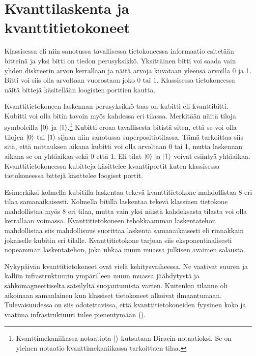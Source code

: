 \section{Kvanttilaskenta ja kvanttitietokoneet}
Klassisessa eli niin sanotussa tavallisessa tietokoneessa informaatio esitetään bitteinä ja yksi bitti on tiedon perusyksikkö. Yksittäinen bitti voi saada vain yhden diskreetin arvon kerrallaan ja näitä arvoja kuvataan yleensä arvoilla 0 ja 1. Bitti voi siis olla arvoltaan vuorostaan joko 0 tai 1. Klassisessa tietokoneessa näitä bittejä käsitellään loogisten porttien kautta.

Kvanttitietokoneen laskennan perusyksikkö taas on kubitti eli kvanttibitti. Kubitti voi olla bitin tavoin myös kahdessa eri tilassa. Merkitään näitä tiloja symboleilla
$\ket{0}$ ja $\ket{1}$.\footnote{Kvanttimekaniikassa notaatiota $\ket{}$ kutsutaan Diracin notaatioksi. Se on yleinen notaatio kvanttimekaniikassa tarkoittaen tilaa.} Kubitti eroaa tavallisesta bitistä siten, että se voi olla tilojen $\ket{0}$ tai $\ket{1}$ sijaan niin sanotussa superpositiotilassa. Tämä tarkoittaa siis sitä, että mittauksen aikana kubitti voi olla arvoltaan 0 tai 1, mutta laskennan aikana se on yhtäaikaa sekä 0 että 1. Eli tilat $\ket{0}$ ja $\ket{1}$ voivat esiintyä yhtäaikaa. Kvanttitietokoneessa kubitteja käsittelee kvanttiportit kuten klassisessa tietokoneessa bittejä käsittelee loogiset portit.

Esimerkiksi kolmella kubitilla laskentaa tekevä kvanttitietokone mahdollistaa 8 eri tilaa samanaikaisesti. Kolmella bitillä laskentaa tekevä klassinen tietokone mahdollistaa myös 8 eri tilaa, mutta vain yksi näistä kahdeksasta tilasta voi olla kerrallaan voimassa. Kvanttitietokoneen tehokkaamman laskentatehon mahdollistaa siis mahdollisuus suorittaa laskenta samanaikaisesti eli rinnakkain jokaiselle kubitin eri tilalle. Kvanttitietokone tarjoaa siis eksponentiaalisesti nopeamman laskentatehon, joka uhkaa muun muassa julkisen avaimen salausta.

Nykypäivän kvanttitietokoneet ovat vielä kehitysvaiheessa. Ne vaativat suuren ja kalliin infrastruktuurin ympärilleen muun muassa jäähdytystä ja sähkömagneettiselta säteilyltä suojautumista varten. Kuitenkin tilanne oli aikoinaan samanlainen kun klassiset tietokoneet alkoivat ilmaantumaan. Tulevaisuudessa on siis odotettavissa, että kvanttitietokoneiden fyysinen koko ja vaatima infrastruktuuri tulee pienentymään (\cite{doi:10.1080/23742917.2016.1226650}).